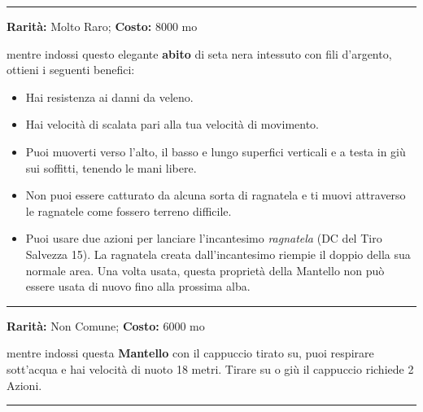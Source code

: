 \begin{multicols}{2}
\smallskip\noindent\rule{\linewidth}{2pt}  \hypertarget{Mantellodell'Aracnide}{}\smallskip{}\noindent\label{Mantellodell'Aracnide}

\textbf{Rarità:} Molto Raro; \textbf{Costo:} 8000 mo

mentre indossi questo elegante \textbf{abito} di seta nera intessuto con fili d'argento, ottieni i seguenti benefici:

\medskip

\begin{itemize}[leftmargin=*] \setlength{\itemsep}{0pt}
\item
Hai resistenza ai danni da veleno.
\item
Hai velocità di scalata pari alla tua velocità di movimento.
\item
Puoi muoverti verso l'alto, il basso e lungo superfici verticali e a testa in giù sui soffitti, tenendo le mani libere.
\item
Non puoi essere catturato da alcuna sorta di ragnatela e ti muovi attraverso le ragnatele come fossero terreno difficile.
\item
Puoi usare due azioni per lanciare l'incantesimo \emph{ragnatela} (DC del Tiro Salvezza 15). La ragnatela creata dall'incantesimo riempie il doppio della sua normale area. Una volta usata, questa proprietà della Mantello non può essere usata di nuovo fino alla prossima alba.
\end{itemize}

\smallskip\noindent\rule{\linewidth}{2pt}  \hypertarget{MantellodellaManta}{}\smallskip{}\noindent\label{MantellodellaManta}

\textbf{Rarità:} Non Comune; \textbf{Costo:} 6000 mo

mentre indossi questa \textbf{Mantello} con il cappuccio tirato su, puoi respirare sott'acqua e hai velocità di nuoto 18 metri. Tirare su o giù il cappuccio richiede 2 Azioni.

\smallskip\noindent\rule{\linewidth}{2pt}  \hypertarget{MantellodellaResistenzaagliIncantesimi}{}\smallskip{}\noindent\label{MantellodellaResistenzaagliIncantesimi}


\end{multicols}
